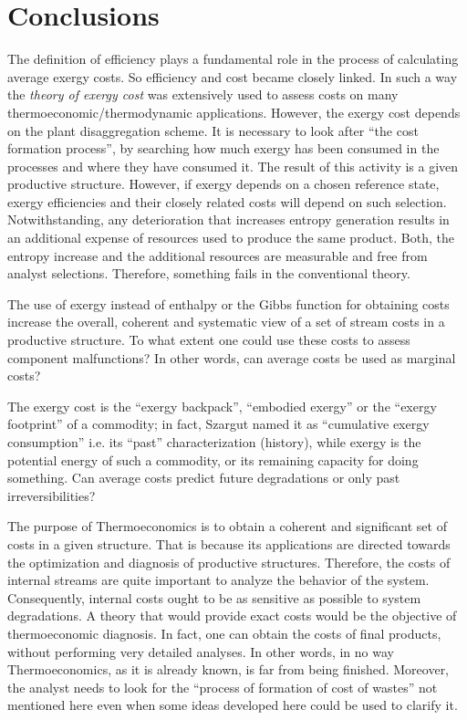\documentclass[energies,article,submit,moreauthors,pdftex]{Definitions/mdpi}
\begin{document}
\section{Conclusions}
The definition of efficiency plays a fundamental role in the process of calculating average exergy costs. So efficiency and cost became closely linked. In such a way the \emph{theory of exergy cost} \cite{Valero1986a,Lozano1993} was extensively used to assess costs on many thermoeconomic/thermodynamic applications. However, the exergy cost depends on the plant disaggregation scheme. It is necessary to look after “the cost formation process”, by searching how much exergy has been consumed in the processes and where they have consumed it. The result of this activity is a given productive structure. However, if exergy depends on a chosen reference state, exergy efficiencies and their closely related costs will depend on such selection. Notwithstanding, any deterioration that increases entropy generation results in an additional expense of resources used to produce the same product. Both, the entropy increase and the additional resources are measurable and free from analyst selections. Therefore, something fails in the conventional theory. 

The use of exergy instead of enthalpy or the Gibbs function for obtaining costs increase the overall, coherent and systematic view of a set of stream costs in a productive structure. To what extent one could use these costs to assess component malfunctions? In other words, can average costs be used as marginal costs?

The exergy cost is the “exergy backpack”, “embodied exergy” or the “exergy footprint” of a commodity; in fact, Szargut named it as “cumulative exergy consumption” i.e. its “past” characterization (history), while exergy is the potential energy of such a commodity, or its remaining capacity for doing something. Can average costs predict future degradations or only past irreversibilities? 

The purpose of Thermoeconomics is to obtain a coherent and significant set of costs in a given structure. That is because its applications are directed towards the optimization and diagnosis of productive structures. Therefore, the costs of internal streams are quite important to analyze the behavior of the system. Consequently, internal costs ought to be as sensitive as possible to system degradations. A theory that would provide exact costs would be the objective of thermoeconomic diagnosis. In fact, one can obtain the costs of final products, without performing very detailed analyses. In other words, in no way Thermoeconomics, as it is already known, is far from being finished. Moreover, the analyst needs to look for the “process of formation of cost of wastes” not mentioned here even when some ideas developed here could be used to clarify it.
\end{document}
